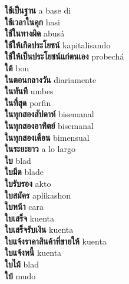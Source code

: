 \textbf{ ใช้เป็นฐาน  } a base di \\
\textbf{ ใช้เวลาในคุก  } hasi \\
\textbf{ ใช้ในทางผิด  } abusá \\
\textbf{ ใช้ให้เกิดประโยชน์  } kapitalisando \\
\textbf{ ใช้ให้เป็นประโยชน์แก่ตนเอง  } probechá \\
\textbf{ ใต้  } bou \\
\textbf{ ในตอนกลางวัน  } diariamente \\
\textbf{ ในทันที  } umbes \\
\textbf{ ในที่สุด  } porfin \\
\textbf{ ในทุกสองสัปดาห์  } bisemanal \\
\textbf{ ในทุกสองอาทิตย์  } bisemanal \\
\textbf{ ในทุกสองเดือน  } bimensual \\
\textbf{ ในระยะยาว  } a lo largo \\
\textbf{ ใบ  } blad \\
\textbf{ ใบมีด  } blade \\
\textbf{ ใบรับรอง  } akto \\
\textbf{ ใบสมัคร  } aplikashon \\
\textbf{ ใบหน้า  } cara \\
\textbf{ ใบเสร็จ  } kuenta \\
\textbf{ ใบเสร็จรับเงิน  } kuenta \\
\textbf{ ใบแจ้งราคาสินค้าที่ขายให้  } kuenta \\
\textbf{ ใบแจ้งหนี้  } kuenta \\
\textbf{ ใบไม้  } blad \\
\textbf{ ใบ้  } mudo \\
